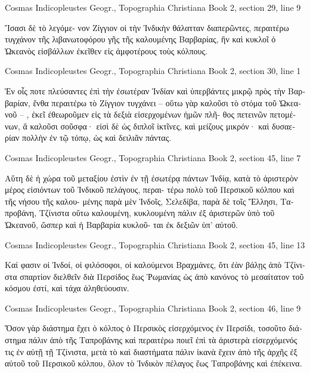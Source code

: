 \documentclass[12pt,letterpaper,twoside,final]{memoir}
\begin{document}
\begin{greek}
Cosmas Indicopleustes Geogr., Topographia Christiana 
Book 2, section 29, line 9

                                                    Ἴσασι δὲ τὸ λεγόμε-
νον Ζίγγιον οἱ τὴν Ἰνδικὴν θάλατταν διαπερῶντες, περαιτέρω 
τυγχάνον τῆς λιβανωτοφόρου γῆς τῆς καλουμένης Βαρβαρίας, 
ἣν καὶ κυκλοῖ ὁ Ὠκεανὸς εἰσβάλλων ἐκεῖθεν εἰς ἀμφοτέρους 
τοὺς κόλπους. 



Cosmas Indicopleustes Geogr., Topographia Christiana 
Book 2, section 30, line 1

Ἐν οἷς ποτε πλεύσαντες ἐπὶ τὴν ἐσωτέραν Ἰνδίαν καὶ 
ὑπερβάντες μικρῷ πρὸς τὴν Βαρβαρίαν, ἔνθα περαιτέρω τὸ 
Ζίγγιον τυγχάνει – οὕτω γὰρ καλοῦσι τὸ στόμα τοῦ Ὠκεα-
νοῦ – , ἐκεῖ ἐθεωροῦμεν εἰς τὰ δεξιὰ εἰσερχομένων ἡμῶν πλῆ-
θος πετεινῶν πετομένων, ἃ καλοῦσι σοῦσφα· εἰσὶ δὲ ὡς διπλοῖ 
ἰκτῖνες, καὶ μείζους μικρόν· καὶ δυσαερίαν πολλὴν ἐν τῷ τόπῳ, 
ὡς καὶ δειλιᾶν πάντας. 



Cosmas Indicopleustes Geogr., Topographia Christiana 
Book 2, section 45, line 7

                                                Αὕτη δὲ ἡ 
χώρα τοῦ μεταξίου ἐστὶν ἐν τῇ ἐσωτέρᾳ πάντων Ἰνδίᾳ, κατὰ 
τὸ ἀριστερὸν μέρος εἰσιόντων τοῦ Ἰνδικοῦ πελάγους, περαι-
τέρω πολὺ τοῦ Περσικοῦ κόλπου καὶ τῆς νήσου τῆς καλου-
μένης παρὰ μὲν Ἰνδοῖς, Σελεδίβα, παρὰ δὲ τοῖς Ἕλλησι, 
Ταπροβάνη, Τζίνιστα οὕτω καλουμένη, κυκλουμένη πάλιν ἐξ 
ἀριστερῶν ὑπὸ τοῦ Ὠκεανοῦ, ὥσπερ καὶ ἡ Βαρβαρία κυκλοῦ-
ται ἐκ δεξιῶν ὑπ' αὐτοῦ. 



Cosmas Indicopleustes Geogr., Topographia Christiana 
Book 2, section 45, line 13

                              Καί φασιν οἱ Ἰνδοί, οἱ φιλόσοφοι, οἱ 
καλούμενοι Βραχμάνες, ὅτι ἐὰν βάλῃς ἀπὸ Τζίνιστα σπαρτίον 
διελθεῖν διὰ Περσίδος ἕως Ῥωμανίας ὡς ἀπὸ κανόνος τὸ 
μεσαίτατον τοῦ κόσμου ἐστί, καὶ τάχα ἀληθεύουσιν. 



Cosmas Indicopleustes Geogr., Topographia Christiana 
Book 2, section 46, line 9

                                                     Ὅσον γὰρ 
διάστημα ἔχει ὁ κόλπος ὁ Περσικὸς εἰσερχόμενος ἐν Περσίδι, 
τοσοῦτο διάστημα πάλιν ἀπὸ τῆς Ταπροβάνης καὶ περαιτέρω 
ποιεῖ ἐπὶ τὰ ἀριστερὰ εἰσερχόμενός τις ἐν αὐτῇ τῇ Τζίνιστα, 
μετὰ τὸ καὶ διαστήματα πάλιν ἱκανὰ ἔχειν ἀπὸ τῆς ἀρχῆς ἐξ 
αὐτοῦ τοῦ Περσικοῦ κόλπου, ὅλον τὸ Ἰνδικὸν πέλαγος ἕως   
Ταπροβάνης καὶ ἐπέκεινα. 




\end{greek}
\end{document}
